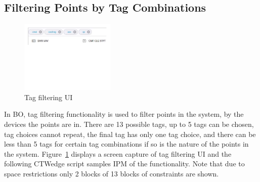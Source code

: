 \documentclass[conference]{IEEEtran}
\begin{document}
	\subsection{Filtering Points by Tag Combinations }

	\begin{figure}[!b]
		\centering
		\includegraphics[width=0.40\textwidth,]{tagFilterModel.pdf}
		\caption{Tag filtering UI}
		\label{fig:tagFilterModel}
	\end{figure}

	In BO, tag filtering functionality is used to filter points in the system, by the devices the points are in.
	There are 13 possible tags, up to 5 tags can be chosen, tag choices cannot repeat, the final tag has only one tag choice, and there can be less than 5 tags for certain tag combinations if so is the nature of the points in the system.
	Figure~\ref{fig:tagFilterModel} displays a screen capture of tag filtering UI and the following CTWedge script samples IPM of the functionality. 
	Note that due to space restrictions only 2 blocks of 13 blocks of constraints are shown.
\end{document}
